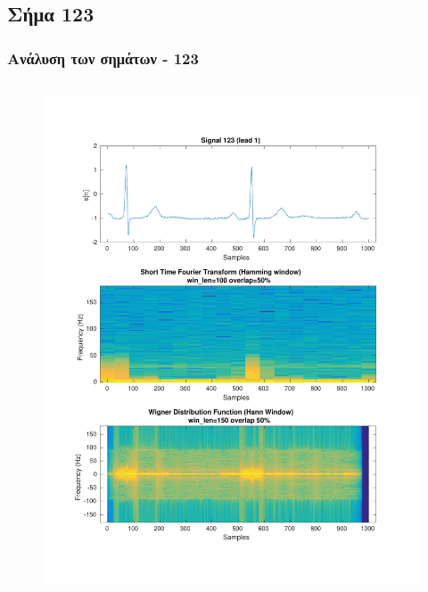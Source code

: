 \documentclass{beamer}
\begin{document}
\subsection{Σήμα 123}
\label{sig:123}
\begin{frame}
\frametitle{Ανάλυση των σημάτων - 123}

\begin{columns}
\begin{figure}
\includegraphics[width=\textwidth]{fig/123l1_stft_wdf.pdf}
\end{figure}


\end{columns}
\end{frame}
\end{document}
